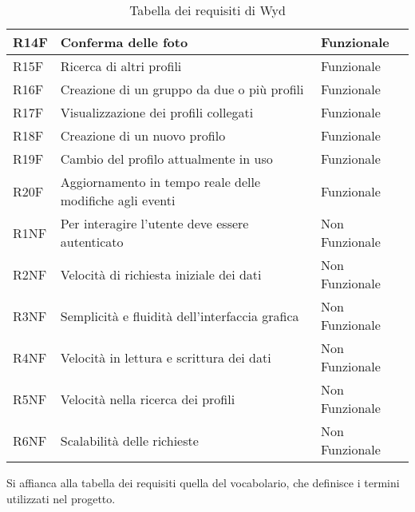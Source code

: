 \begin{table}
\begin{tabular} {|P{1.3cm}|P{11.2cm}|P{3cm}|}
        \hline
        R14F        & Conferma delle foto                                                         & Funzionale     \\
        \hline
        R15F        & Ricerca di altri profili                                                    & Funzionale     \\
        \hline
        R16F        & Creazione di un gruppo da due o più profili                                 & Funzionale     \\
        \hline
        R17F        & Visualizzazione dei profili collegati                                       & Funzionale     \\
        \hline
        R18F        & Creazione di un nuovo profilo                                               & Funzionale     \\
        \hline
        R19F        & Cambio del profilo attualmente in uso                                       & Funzionale     \\
        \hline
        R20F        & Aggiornamento in tempo reale delle modifiche agli eventi                    & Funzionale     \\
        \hline
        R1NF        & Per interagire l’utente deve essere autenticato                             & Non Funzionale \\
        \hline
        R2NF        & Velocità di richiesta iniziale dei dati                                     & Non Funzionale \\
        \hline
        R3NF        & Semplicità e fluidità dell'interfaccia grafica                              & Non Funzionale \\
        \hline
        R4NF        & Velocità in lettura e scrittura dei dati                                    & Non Funzionale \\
        \hline
        R5NF        & Velocità nella ricerca dei profili                                          & Non Funzionale \\
        \hline
        R6NF        & Scalabilità delle richieste                                                 & Non Funzionale \\
        \hline
    \end{tabular}
    \caption{Tabella dei requisiti di Wyd}
\end{table}
\clearpage

Si affianca alla tabella dei requisiti quella del vocabolario, che definisce i termini utilizzati nel progetto.\\

